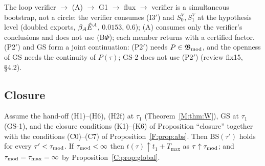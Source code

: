 \documentclass[11pt]{article}
\begin{document}
\noindent The loop verifier $\to$ (A) $\to$ G1 $\to$ flux $\to$ verifier is a simultaneous bootstrap, not a circle: the verifier consumes (I3$'$) and $S^V_0,S^V_1$ at the hypothesis level (doubled exports, $\beta_A\hat E^A$, $0.0153$, $0.6$); (A) consumes only the verifier's conclusions and does not use (B$\Phi$); each member returns with a certified factor. (P2$'$) and GS form a joint continuation: (P2$'$) needs $P\in\mathfrak B_{\rm mod}$, and the openness of GS needs the continuity of $P(\tau)$; GS-2 does not use (P2$'$) (review fix15, \S4.2).

\subsection{Closure}\label{BS:sec:close}
\begin{proposition}\label{BS:prop:close}
Assume the hand-off (H1)--(H6), (H2f) at $\tau_1$ (Theorem~\ref{M:thm:W}), GS at $\tau_1$ (GS-1), and the closure conditions (K1)--(K6) of  Proposition ``closure'' together with the conditions (C0)--(C7) of Proposition~\ref{F:prop:abs}. Then $\mathrm{BS}(\tau')$ holds for every $\tau'<\tau_{\rm mod}$. If $\tau_{\rm mod}<\infty$ then $t(\tau)\uparrow t_1+T_{\max}$ as $\tau\uparrow\tau_{\rm mod}$; and $\tau_{\rm mod}=\tau_{\max}=\infty$ by Proposition~\ref{C:prop:global}.
\end{proposition}
\end{document}
